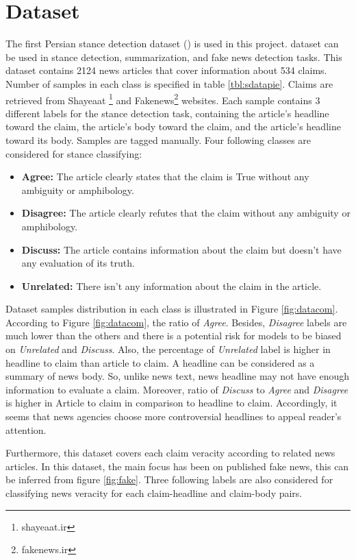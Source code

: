 \section{Dataset}
\label{sec:dataset}
The first Persian stance detection dataset (\cite{stance_persian})  is used in this project. \cite{stance_persian} dataset can be used in stance detection, summarization, and fake news detection tasks. This dataset contains 2124 news articles that cover information about 534 claims. Number of samples in each class is specified in table \ref{tbl:sdatapie}. Claims are retrieved from Shayeaat \footnote{shayeaat.ir} and Fakenews\footnote{fakenews.ir} websites. Each sample contains 3 different labels for the stance detection task, containing the article's headline toward the claim, the article's body toward the claim, and the article's headline toward its body. Samples are tagged manually. Four following classes are considered for stance classifying:
\begin{itemize}
	\item {\color{green!70!black}\textbf{Agree:}} The article clearly states that the claim is True without any ambiguity or amphibology. 
	\item {\color{red!70!black}\textbf{Disagree:}} The article clearly refutes that the claim without any ambiguity or amphibology. 
	\item {\color{yellow!70!black}\textbf{Discuss:}} The article contains information about the claim but doesn't have any evaluation of its truth. 
	\item {\color{gray!}\textbf{Unrelated:}} There isn't any information about the claim in the article.
\end{itemize}
Dataset samples distribution in each class is illustrated in Figure \ref{fig:datacom}. According to Figure \ref{fig:datacom}, the ratio of \textit{Agree}. Besides, \textit{Disagree} labels are much lower than the others and there is a potential risk for models to be biased on \textit{Unrelated} and \textit{Discuss}. Also, the percentage of \textit{Unrelated} label is higher in headline to claim than article to claim. A headline can be considered as a summary of news body. So, unlike news text, news headline may not have enough information to evaluate a claim.  Moreover, ratio of \textit{Discuss} to \textit{Agree} and \textit{Disagree} is higher in Article to claim in comparison to headline to claim. Accordingly, it seems that news agencies choose more controversial headlines to appeal reader's attention.

Furthermore, this dataset covers each claim veracity according to related news articles. In this dataset, the main focus has been on published fake news, this can be inferred from figure \ref{fig:fake}. Three following labels are also considered for classifying news veracity for each claim-headline and claim-body pairs.

